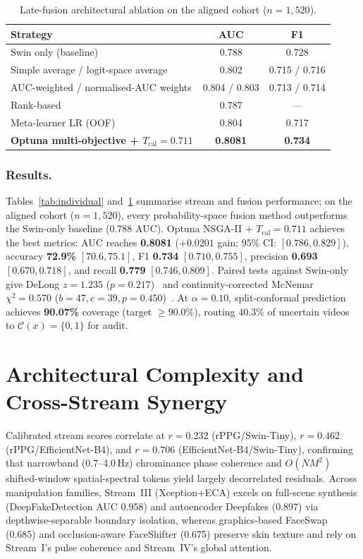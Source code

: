 \documentclass[runningheads]{llncs}
\providecommand{\Description}[1]{}
\newcommand{\Tcal}{T_{\mathrm{cal}}}
\begin{document}
\begin{table}[!t]
\centering
\caption{Late-fusion architectural ablation on the aligned cohort ($n{=}1,520$).}
\label{tab:ablation}
\small
\begin{tabular}{@{}lcc@{}}
\toprule
\textbf{Strategy} & \textbf{AUC} & \textbf{F1}\\
\midrule
Swin only (baseline) & 0.788 & 0.728\\
Simple average / logit-space average & 0.802 & 0.715 / 0.716\\
AUC-weighted / normalised-AUC weights & 0.804 / 0.803 & 0.713 / 0.714\\
Rank-based & 0.787 & ---\\
Meta-learner LR (OOF) & 0.804 & 0.717\\
\textbf{Optuna multi-objective + $\Tcal{=}0.711$} & \textbf{0.8081} & \textbf{0.734}\\
\bottomrule
\end{tabular}
\Description{Fusion ablation table comparing Swin-only, simple average, AUC-weighted, rank-based, logistic-regression meta-learner and Optuna multi-objective fusion by AUC and F1 on the aligned set.}
\end{table}

\subsubsection{Results.}
Tables~\ref{tab:individual} and~\ref{tab:ablation} summarise stream and fusion performance; on the aligned cohort ($n{=}1,520$), every probability-space fusion method outperforms the Swin-only baseline (0.788 AUC). Optuna NSGA-II + $\Tcal{=}0.711$ achieves the best metrics: AUC reaches \textbf{0.8081} ($+0.0201$ gain; 95\% CI: $[0.786, 0.829]$), accuracy \textbf{72.9\%} $[70.6, 75.1]$, F1 \textbf{0.734} $[0.710, 0.755]$, precision \textbf{0.693} $[0.670, 0.718]$, and recall \textbf{0.779} $[0.746, 0.809]$. Paired tests against Swin-only give DeLong $z{=}1.235$ ($p{=}0.217$)~\cite{delong1988} and continuity-corrected McNemar $\chi^2{=}0.570$ ($b{=}47,c{=}39,p{=}0.450$)~\cite{mcnemar1947}. At $\alpha{=}0.10$, split-conformal prediction achieves \textbf{90.07\%} coverage (target $\ge 90.0\%$), routing 40.3\% of uncertain videos to $\mathcal C(x){=}\{0,1\}$ for audit.

\section{Architectural Complexity and Cross-Stream Synergy}
Calibrated stream scores correlate at $r{=}0.232$ (rPPG/Swin-Tiny), $r{=}0.462$ (rPPG/EfficientNet-B4), and $r{=}0.706$ (EfficientNet-B4/Swin-Tiny), confirming that narrowband (0.7--4.0\,Hz) chrominance phase coherence and $O(NM^2)$ shifted-window spatial-spectral tokens yield largely decorrelated residuals. Across manipulation families, Stream~III (Xception+ECA) excels on full-scene synthesis (DeepFakeDetection AUC 0.958) and autoencoder Deepfakes (0.897) via depthwise-separable boundary isolation, whereas graphics-based FaceSwap (0.685) and occlusion-aware FaceShifter (0.675) preserve skin texture and rely on Stream~I's pulse coherence and Stream~IV's global attention.
\end{document}
